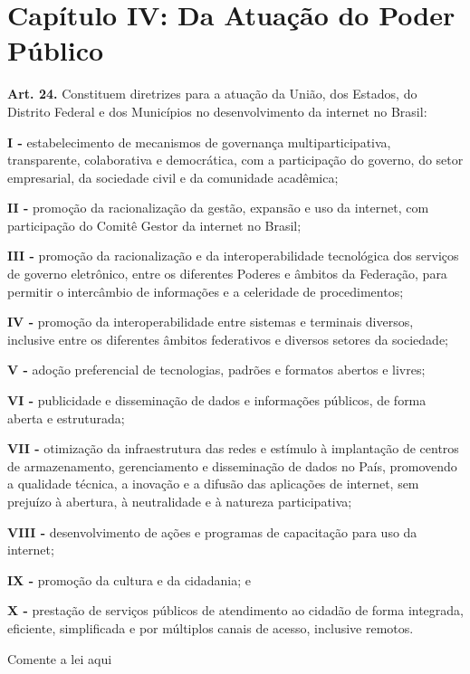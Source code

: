 \section{Capítulo IV: Da Atuação do Poder Público}


\noindent\textbf{Art. 24.} Constituem diretrizes para a atuação da União, dos Estados, do Distrito Federal e dos Municípios no desenvolvimento da internet no Brasil:

\noindent\textbf{I -} estabelecimento de mecanismos de governança multiparticipativa, transparente, colaborativa e democrática, com a participação do governo, do setor empresarial, da sociedade civil e da comunidade acadêmica;

\noindent\textbf{II -} promoção da racionalização da gestão, expansão e uso da internet, com participação do Comitê Gestor da internet no Brasil;

\noindent\textbf{III -} promoção da racionalização e da interoperabilidade tecnológica dos serviços de governo eletrônico, entre os diferentes Poderes e âmbitos da Federação, para permitir o intercâmbio de informações e a celeridade de procedimentos;

\noindent\textbf{IV -} promoção da interoperabilidade entre sistemas e terminais diversos, inclusive entre os diferentes âmbitos federativos e diversos setores da sociedade;

\noindent\textbf{V -} adoção preferencial de tecnologias, padrões e formatos abertos e livres;

\noindent\textbf{VI -} publicidade e disseminação de dados e informações públicos, de forma aberta e estruturada;

\noindent\textbf{VII -} otimização da infraestrutura das redes e estímulo à implantação de centros de armazenamento, gerenciamento e disseminação de dados no País, promovendo a qualidade técnica, a inovação e a difusão das aplicações de internet, sem prejuízo à abertura, à neutralidade e à natureza participativa;

\noindent\textbf{VIII -} desenvolvimento de ações e programas de capacitação para uso da internet;

\noindent\textbf{IX -} promoção da cultura e da cidadania; e

\noindent\textbf{X -} prestação de serviços públicos de atendimento ao cidadão de forma integrada, eficiente, simplificada e por múltiplos canais de acesso, inclusive remotos.

\begin{displayquote}
Comente a lei aqui  
\end{displayquote}


